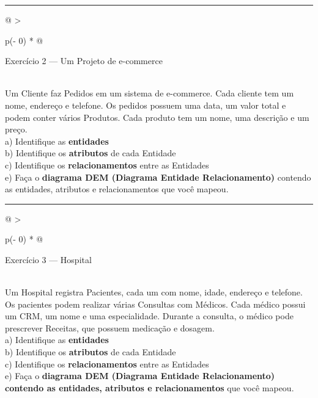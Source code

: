 \documentclass[
]{book}
\begin{document}
\begin{center}\rule{0.5\linewidth}{0.5pt}\end{center}

\begin{longtable}[]{@{}
  >{\raggedright\arraybackslash}p{(\columnwidth - 0\tabcolsep) * }@{}}
\toprule\noalign{}
\begin{minipage}[b]{\linewidth}\raggedright
Exercício 2 --- Um Projeto de e-commerce
\end{minipage} \\
\midrule\noalign{}
\endhead
\bottomrule\noalign{}
\endlastfoot
Um Cliente faz Pedidos em um sistema de e-commerce. Cada cliente tem um nome, endereço e telefone. Os pedidos possuem uma data, um valor total e podem conter vários Produtos. Cada produto tem um nome, uma descrição e um preço. \\
a) Identifique as \textbf{entidades} \\
b) Identifique os \textbf{atributos} de cada Entidade \\
c) Identifique os \textbf{relacionamentos} entre as Entidades \\
e) Faça o \textbf{diagrama DEM (Diagrama Entidade Relacionamento)} contendo as entidades, atributos e relacionamentos que você mapeou. \\
\end{longtable}

\begin{center}\rule{0.5\linewidth}{0.5pt}\end{center}

\begin{longtable}[]{@{}
  >{\raggedright\arraybackslash}p{(\columnwidth - 0\tabcolsep) * }@{}}
\toprule\noalign{}
\begin{minipage}[b]{\linewidth}\raggedright
Exercício 3 --- Hospital
\end{minipage} \\
\midrule\noalign{}
\endhead
\bottomrule\noalign{}
\endlastfoot
Um Hospital registra Pacientes, cada um com nome, idade, endereço e telefone. Os pacientes podem realizar várias Consultas com Médicos. Cada médico possui um CRM, um nome e uma especialidade. Durante a consulta, o médico pode prescrever Receitas, que possuem medicação e dosagem. \\
a) Identifique as \textbf{entidades} \\
b) Identifique os \textbf{atributos} de cada Entidade \\
c) Identifique os \textbf{relacionamentos} entre as Entidades \\
e) Faça o \textbf{diagrama DEM (Diagrama Entidade Relacionamento) contendo as entidades, atributos e relacionamentos} que você mapeou. \\
\end{longtable}
\end{document}
